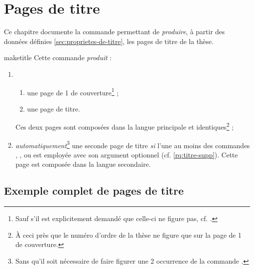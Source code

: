 \chapter{Pages de titre}\label{cha:pages-de-titre}

Ce chapitre documente la commande  permettant de
\emph{produire}, à partir des données définies \vref{sec:proprietes-de-titre},
les pages de titre de la thèse.

\begin{docCommand}[doc description=\mandatory]{maketitle}{}
  Cette commande \emph{produit} :
  \begin{enumerate}
  \item
    \begin{enumerate}
    \item une page de 1\iere{} de couverture\footnote{Sauf s'il est
        explicitement demandé que celle-ci ne figure pas,
        cf. .} ;
    \item une page de titre.
    \end{enumerate}
    Ces deux pages sont composées dans la langue principale et
    identiques\footnote{À ceci près que le numéro d'ordre de la thèse ne figure
      que sur la page de 1\iere{} de couverture.} ;
  \item \emph{automatiquement}\footnote{Sans qu'il soit nécessaire de faire
      figurer une 2\ieme{} occurrence de la commande .} une
    seconde page de titre \emph{si}  l'une au moins des
    commandes , ,  ou
     est employée avec son argument optionnel
    (cf. \vref{rq:titre-supp}). Cette page est composée dans la langue
    secondaire.
  \end{enumerate}
\end{docCommand}

\section{Exemple complet de pages de titre}
\label{sec:exemple-complet}

